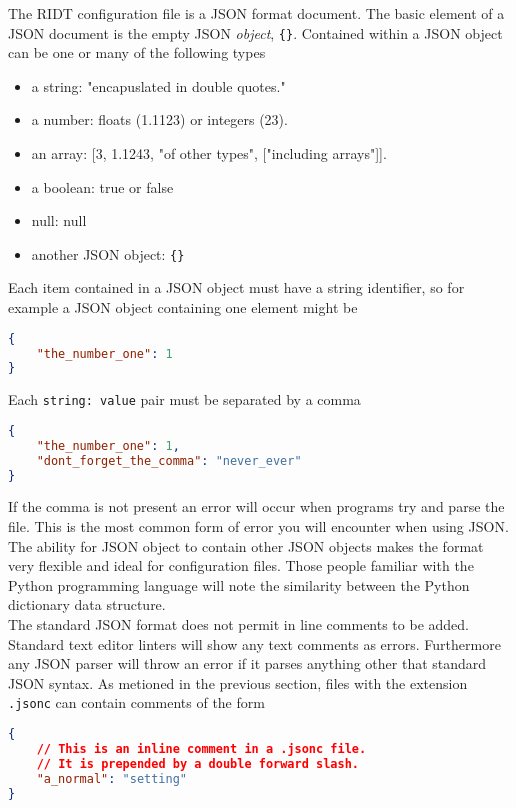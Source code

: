 \documentclass[]{article}
\def\code#1{\texttt{#1}}
\begin{document}
The RIDT configuration file is a JSON format document. The basic element of a
JSON document is the empty JSON \emph{object}, \code{\{\}}. Contained within
a JSON object can be one or many of the following types
\begin{itemize}
    \item a string: "encapuslated in double quotes."
    \item a number: floats (1.1123) or integers (23).
    \item an array: [3, 1.1243, "of other types", ["including arrays"]].
    \item a boolean: true or false
    \item null: null
    \item another JSON object: \code{\{\}}
\end{itemize}
Each item contained in a JSON object must have a string identifier, so for
example a JSON object containing one element might be\\
\begin{lstlisting}[language=json,firstnumber=1]
{
    "the_number_one": 1
}
\end{lstlisting}
\medskip
Each \code{string: value} pair must be separated by a comma\\
\begin{lstlisting}[language=json,firstnumber=1]
{
    "the_number_one": 1,
    "dont_forget_the_comma": "never_ever"
}
\end{lstlisting}
\medskip
If the comma is not present an error will occur when programs try and parse the
file. This is the most common form of error you will encounter when using
JSON.\\

\noindent The ability for JSON object to contain other JSON objects makes the
format very flexible and ideal for configuration files. Those people familiar
with the Python programming language will note the similarity between the Python
dictionary data structure.\\

\noindent The standard JSON format does not permit in line comments to be added.
Standard text editor linters will show any text comments as errors. Furthermore
any JSON parser will throw an error if it parses anything other that standard
JSON syntax. As metioned in the previous section, files with the extension
\code{.jsonc} can contain comments of the form\\
\begin{lstlisting}[language=json, firstnumber=1]
{
    // This is an inline comment in a .jsonc file.
    // It is prepended by a double forward slash.
    "a_normal": "setting"
}
\end{lstlisting}
\medskip
\end{document}
